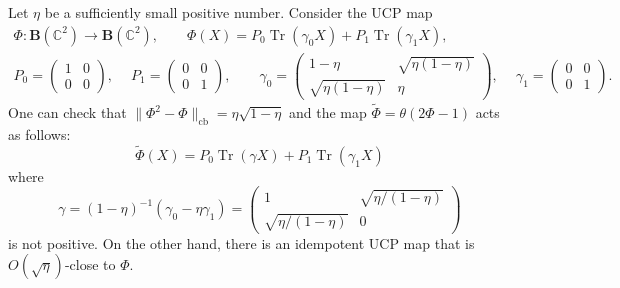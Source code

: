 \documentclass[12pt]{article}
\newcommand{\CC}{\mathbb{C}}
\DeclareMathOperator{\Tr}{Tr}
\newcommand{\cb}{\mathrm{cb}}
\newcommand{\Bo}{\mathbf{B}}
\newcommand{\wt}{\widetilde}
\newtheorem[definition]{Definition}[Theorem]{Definition}
\newtheorem[remark]{Example}[Theorem]{Example}
\newtheorem[remark]{Remark}[Theorem]{Remark}
\newtheorem[remark]{Question}[Theorem]{Open question}
\newtheorem*[definition]{definition}{Definition}
\newtheorem*[remark]{example}{Example}
\newtheorem*[remark]{remark}{Remark}
\newtheorem*[remark]{question}{Open question}
\numberwithin{equation}{section}
\begin{document}
\begin{Example}
Let $\eta$ be a sufficiently small positive number. Consider the UCP map
\begin{gather}
\Phi\colon\Bo(\CC^2)\to\Bo(\CC^2),\qquad
\Phi(X)= P_0\Tr(\gamma_0 X)+P_1\Tr(\gamma_1 X),
\\[3pt]
P_0 = \begin{pmatrix} 1 & 0\\ 0 & 0\end{pmatrix},\quad\:
P_1 = \begin{pmatrix} 0 & 0\\ 0 & 1\end{pmatrix},\qquad
\gamma_0 =\begin{pmatrix}
1-\eta & \sqrt{\eta(1-\eta)}\\ \sqrt{\eta(1-\eta)} & \eta
\end{pmatrix},\quad\:
\gamma_1 =\begin{pmatrix} 0 & 0\\ 0 & 1\end{pmatrix}.
\end{gather}
One can check that $\|\Phi^2-\Phi\|_\cb=\eta\sqrt{1-\eta}$ and the map $\wt{\Phi}=\theta(2\Phi-1)$ acts as follows:
\begin{equation}
\wt{\Phi}(X)=P_0\Tr(\gamma X)+P_1\Tr(\gamma_1 X)
\end{equation}
where\vspace{-3pt}
\begin{equation}
\gamma = (1-\eta)^{-1} (\gamma_0 - \eta\gamma_1)
= \begin{pmatrix} 1 & \sqrt{\eta/(1-\eta)}\\ \sqrt{\eta/(1-\eta)} & 0\end{pmatrix}
\end{equation}
is not positive. On the other hand, there is an idempotent UCP map that is $O(\sqrt{\eta})$-close to $\Phi$.
\end{Example}
\end{document}
